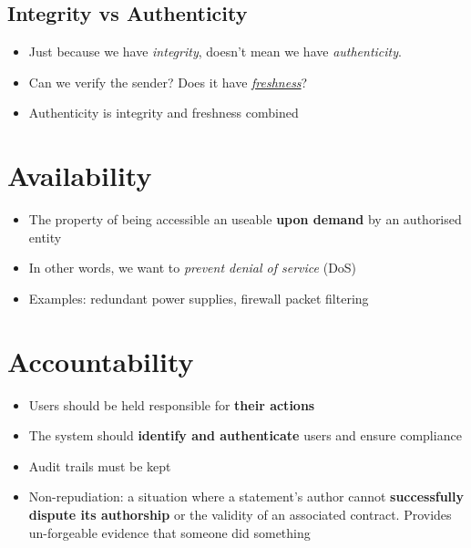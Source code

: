 \documentclass{article}
\newcommand{\worddef}[1]{\hyperref[sec:reference]{\textit{#1}}}
\begin{document}
\subsection{Integrity vs Authenticity}
\begin{itemize}
  \item Just because we have \textit{integrity}, doesn’t mean we have \textit{authenticity}.
  \item Can we verify the sender? Does it have \worddef{freshness}?
  \item Authenticity is integrity and freshness combined
\end{itemize}

\section{Availability}
\begin{itemize}
  \item The property of being accessible an useable \textbf{upon demand} by an authorised entity
  \item In other words, we want to \textit{prevent denial of service} (DoS)
  \item Examples: redundant power supplies, firewall packet filtering
\end{itemize}

\section{Accountability}
\begin{itemize}
  \item Users should be held responsible for \textbf{their actions} 
  \item The system should \textbf{identify and authenticate} users and ensure compliance 
  \item Audit trails must be kept 
  \item Non-repudiation: a situation where a statement's author cannot \textbf{successfully dispute its authorship} or the validity of an associated contract. Provides un-forgeable evidence that someone did something
\end{itemize}
\end{document}
